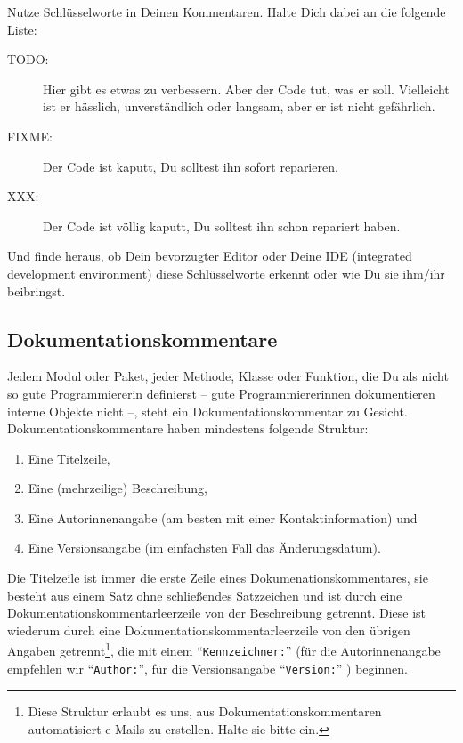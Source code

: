\documentclass[twoside]{scrreprt}
\providecommand{\code}[1]{\texttt{#1}}
\begin{document}
Nutze Schl\"u{}sselworte in Deinen Kommentaren. Halte Dich dabei an die folgende
Liste:
\begin{description}
\item[TODO:] Hier gibt es etwas zu verbessern. Aber der Code tut, was er soll.
  Vielleicht ist er h\"a{}sslich, 
  unverst\"a{}ndlich oder langsam,
  aber er ist nicht gef\"a{}hrlich.
\item[FIXME:] Der Code ist kaputt, Du solltest ihn sofort reparieren.
\item[XXX:] Der Code ist v\"o{}llig kaputt, Du solltest ihn schon repariert
    haben.
\end{description}
Und finde heraus, ob Dein bevorzugter Editor oder Deine IDE (integrated
development environment) diese Schl\"u{}sselworte erkennt oder wie Du sie
ihm/ihr beibringst.

\subsection{Dokumentationskommentare\label{sec:doccom}}
Jedem Modul oder Paket, jeder Methode, Klasse oder Funktion, die Du als nicht so
gute Programmiererin definierst -- gute Programmiererinnen dokumentieren interne
Objekte nicht --, steht ein Dokumentationskommentar zu Gesicht.
Dokumentationskommentare haben mindestens
folgende Struktur:
\begin{enumerate}
    \item Eine Titelzeile,
    \item Eine (mehrzeilige) Beschreibung,
    \item Eine Autorinnenangabe (am besten mit einer Kontaktinformation) und
    \item Eine Versionsangabe (im einfachsten Fall das \"A{}nderungsdatum).
\end{enumerate}
Die Titelzeile ist immer die erste Zeile eines Dokumenationskommentares, sie
besteht aus einem Satz ohne schlie\ss{}endes Satzzeichen und ist durch eine
Dokumentationskommentarleerzeile von der Beschreibung getrennt. Diese ist
wiederum durch eine Dokumentationskommentarleerzeile von den \"u{}brigen Angaben
getrennt\footnote{
    Diese Struktur erlaubt es uns, aus Dokumentationskommentaren automatisiert
    e-Mails zu erstellen. Halte sie bitte ein.
}, die mit einem "`\code{Kennzeichner:}"' (f\"u{}r die Autorinnenangabe
empfehlen wir "`\code{Author:}"', f\"u{}r die Versionsangabe "`\code{Version:}"'
) beginnen.
\end{document}
